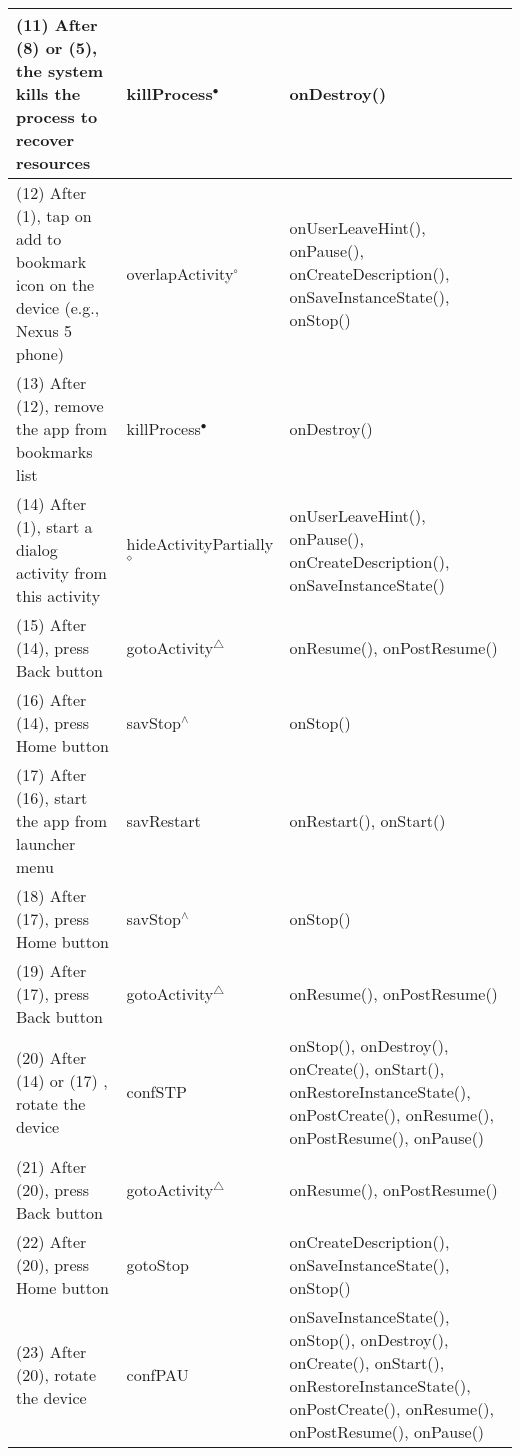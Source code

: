 \documentclass[10pt]{elsarticle}
\begin{document}
\begin{ThreePartTable}
\begin{scriptsize}
\begin{longtable}{P{3.2cm} P{1.5cm} P{5.9cm}}
(11) After (8) or (5), the system kills the process to recover resources & killProcess${^\bullet}$ & {\ttfamily onDestroy()}\\ \hline
(12) After (1), tap on add to bookmark icon on the device (e.g., Nexus 5 phone) & overlapActivity${^\circ}$ & {\ttfamily onUserLeaveHint()}, {\ttfamily onPause()}, {\ttfamily onCreateDescription()}, {\ttfamily onSaveInstanceState()}, {\ttfamily onStop()}\\ \hline
(13) After (12), remove the app from bookmarks list & killProcess${^\bullet}$ & {\ttfamily onDestroy()}\\ \hline
(14) After (1), start a dialog activity from this activity & hideActivityPartially${^\diamond}$ & {\ttfamily onUserLeaveHint()}, {\ttfamily onPause()}, {\ttfamily onCreateDescription()}, {\ttfamily onSaveInstanceState()}\\ \hline
(15) After (14), press Back button & gotoActivity${^\triangle}$ & {\ttfamily onResume()}, {\ttfamily onPostResume()} \\ \hline
(16) After (14), press Home button & savStop${^\wedge}$ & {\ttfamily onStop()}\\ \hline
(17) After (16), start the app from launcher menu & savRestart & {\ttfamily onRestart()}, {\ttfamily onStart()}\\ \hline
(18) After (17), press Home button & savStop${^\wedge}$ & {\ttfamily onStop()}\\ \hline
(19) After (17), press Back button & gotoActivity${^\triangle}$ & {\ttfamily onResume()}, {\ttfamily onPostResume()}\\ \hline
(20) After (14) or (17) , rotate the device & confSTP & {\ttfamily onStop()}, {\ttfamily onDestroy()}, {\ttfamily onCreate()}, {\ttfamily onStart()}, {\ttfamily onRestoreInstanceState()}, {\ttfamily onPostCreate()}, {\ttfamily onResume()}, {\ttfamily onPostResume()}, {\ttfamily onPause()}\\ \hline 
(21) After (20), press Back button & gotoActivity${^\triangle}$ & {\ttfamily onResume()}, {\ttfamily onPostResume()}\\ \hline
(22) After (20), press Home button & gotoStop & {\ttfamily onCreateDescription()}, {\ttfamily onSaveInstanceState()}, {\ttfamily onStop()}\\ \hline
(23) After (20), rotate the device & confPAU & {\ttfamily onSaveInstanceState()}, {\ttfamily onStop()}, {\ttfamily onDestroy()}, {\ttfamily onCreate()}, {\ttfamily onStart()}, {\ttfamily onRestoreInstanceState()}, {\ttfamily onPostCreate()}, {\ttfamily onResume()}, {\ttfamily onPostResume()}, {\ttfamily onPause()}\\ \hline

\end{longtable}
\end{scriptsize}
\end{ThreePartTable}
\end{document}
